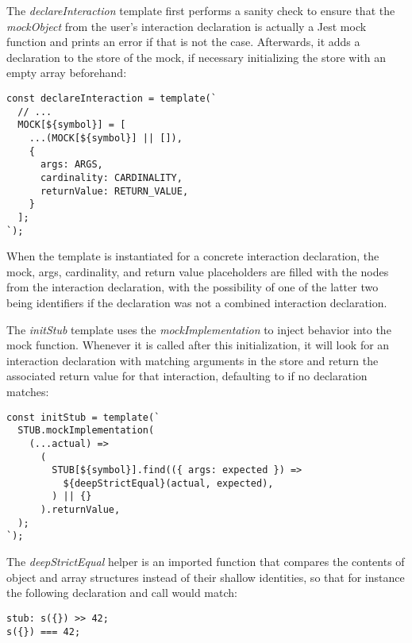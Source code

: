 The \textit{declareInteraction} template first
performs a sanity check to ensure that
the \textit{mockObject} from the user's interaction declaration
is actually a Jest mock function and
prints an error if that is not the case.
Afterwards, it adds a declaration to the store of the mock,
if necessary initializing the store with an empty array beforehand:
\begin{verbatim}
const declareInteraction = template(`
  // ...
  MOCK[${symbol}] = [
    ...(MOCK[${symbol}] || []),
    {
      args: ARGS,
      cardinality: CARDINALITY,
      returnValue: RETURN_VALUE,
    }
  ];
`);
\end{verbatim}
When the template is instantiated for a concrete interaction declaration,
the mock, args, cardinality, and return value placeholders
are filled with the nodes from the interaction declaration,
with the possibility of one of the latter two being  identifiers
if the declaration was not a combined interaction declaration.

The \textit{initStub} template uses the \textit{mockImplementation}
to inject behavior into the mock function.
Whenever it is called after this initialization,
it will look for an interaction declaration
with matching arguments in the store
and return the associated return value for that interaction,
defaulting to  if no declaration matches:
\begin{verbatim}
const initStub = template(`
  STUB.mockImplementation(
    (...actual) =>
      (
        STUB[${symbol}].find(({ args: expected }) =>
          ${deepStrictEqual}(actual, expected),
        ) || {}
      ).returnValue,
  );
`);
\end{verbatim}
The \textit{deepStrictEqual} helper is an imported function
that compares the contents of object and array structures
instead of their shallow identities,
so that for instance the following declaration and call would match:
\begin{verbatim}
stub: s({}) >> 42;
s({}) === 42;
\end{verbatim}

